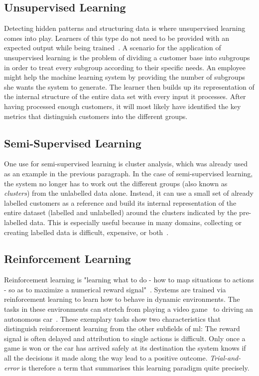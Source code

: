 \documentclass[
			   fontsize=11pt,
               paper=a4,
               bibliography=totoc,
               idxtotoc,
               headsepline,
               footsepline,
               footinclude=false,
               BCOR=12mm,
               DIV=13,
               openany,   %
               oneside    %
               ]
               {scrbook}
\begin{document}
\subsection{Unsupervised Learning}
Detecting hidden patterns and structuring data is where unsupervised learning comes into play. Learners of this type do not need to be provided with an expected output while being trained~\cite{introUnsupervised}. A scenario for the application of unsupervised learning is the problem of dividing a customer base into subgroups in order to treat every subgroup according to their specific needs. An employee might help the machine learning system by providing the number of subgroups she wants the system to generate. The learner then builds up its representation of the internal structure of the entire data set with every input it processes. After having processed enough customers, it will most likely have identified the key metrics that distinguish customers into the different groups. 

\subsection{Semi-Supervised Learning}
One use for semi-supervised learning is cluster analysis, which was already used as an example in the previous paragraph. In the case of semi-supervised learning, the system no longer has to work out the different groups (also known as \textit{clusters}) from the unlabelled data alone. Instead, it can use a small set of already labelled customers as a reference and build its internal representation of the entire dataset (labelled and unlabelled) around the clusters indicated by the pre-labelled data. This is especially useful because in many domains, collecting or creating labelled data is difficult, expensive, or both~\cite{introSemiSup}.

\subsection{Reinforcement Learning}

Reinforcement learning is "learning what to do - how to map situations to actions - so as to maximize a numerical reward signal"~\cite{introRL}. Systems are trained via reinforcement learning to learn how to behave in dynamic environments. The tasks in these environments can stretch from playing a video game~\cite{rlStarCraft} to driving an autonomous car~\cite{rlCars}. These exemplary tasks show two characteristics that distinguish reinforcement learning from the other subfields of \gls{ml}: The reward signal is often delayed and attribution to single actions is difficult. Only once a game is won or the car has arrived safely at its destination the system knows if all the decisions it made along the way lead to a positive outcome. \textit{Trial-and-error} is therefore a term that summarises this learning paradigm quite precisely.
\end{document}
